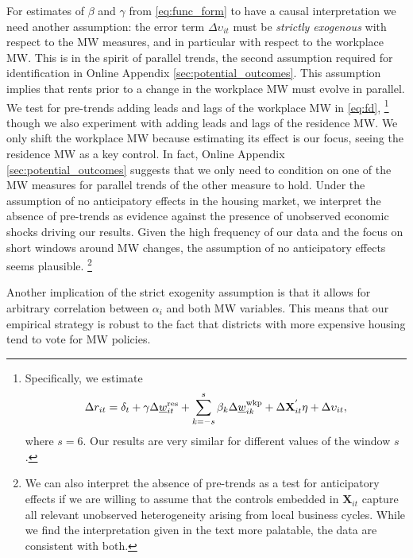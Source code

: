 For estimates of $\beta$ and $\gamma$ from \eqref{eq:func_form} to have a causal 
interpretation we need another assumption: the error term $\Delta\upsilon_{it}$ 
must be \textit{strictly exogenous} with respect to the MW measures, and in 
particular with respect to the workplace MW.
This is in the spirit of parallel trends, the second assumption required for
identification in Online Appendix \ref{sec:potential_outcomes}.
This assumption implies that rents prior to a change in the workplace MW must
evolve in parallel.
We test for pre-trends adding leads and lags of the workplace MW in 
\eqref{eq:fd},%
\footnote{Specifically, we estimate
    \begin{equation*}
        \Delta r_{it} = \delta_t
                    + \gamma \Delta \underline{w}^{\text{res}}_{it} 
                    + \sum_{k=-s}^{s} \beta_k \Delta \underline{w}^{\text{wkp}}_{ik}
                    + \Delta \mathbf{X}^{'}_{it}\eta
                    + \Delta \upsilon_{it} ,
    \end{equation*}
    where $s=6$.
    Our results are very similar for different values of the window $s$.}
though we also experiment with adding leads and lags of the residence MW.
We only shift the workplace MW because estimating its effect is our focus, 
seeing the residence MW as a key control.
In fact, Online Appendix \ref{sec:potential_outcomes} suggests that we 
only need to condition on one of the MW measures for parallel trends of the 
other measure to hold.
Under the assumption of no anticipatory effects in the housing market, we 
interpret the absence of pre-trends as evidence against the presence 
of unobserved economic shocks driving our results.
Given the high frequency of our data and the focus on short windows around 
MW changes, the assumption of no anticipatory effects seems plausible.%
\footnote{We can also interpret the absence of pre-trends as a test for 
    anticipatory effects if we are willing to assume that the controls embedded 
    in $\mathbf{X}_{it}$ capture all relevant unobserved heterogeneity arising 
    from local business cycles.
    While we find the interpretation given in the text more palatable, the data 
    are consistent with both.}

Another implication of the strict exogenity assumption is that it allows for 
arbitrary correlation between $\alpha_i$ and both MW variables.
This means that our empirical strategy is robust to the fact that districts 
with more expensive housing tend to vote for MW policies.

